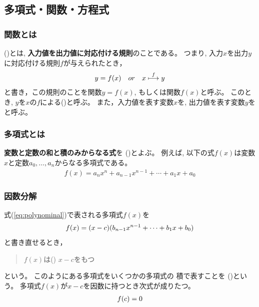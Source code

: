 \documentclass[twocolumn,11pt]{jarticle}
\begin{document}
\subsection{多項式・関数・方程式}

\subsubsection{関数とは}
()とは,
\textbf{入力値を出力値に対応付ける規則}のことである。
つまり, 入力$x$を出力$y$に対応付ける規則$f$が与えられたとき，
\begin{align}
  y=f(x)\quad or\quad x \overset{f}{\longmapsto} y\notag
\end{align}
と書き，この規則のことを関数$y=f(x)$, もしくは関数$f(x)$と呼ぶ。
このとき, $y$を$x$の$f$による()と呼ぶ。
また，入力値を表す変数$x$を,
出力値を表す変数$y$をと呼ぶ。


\subsubsection{多項式とは}
\textbf{変数と定数の和と積のみからなる式}を
()とよぶ。
例えば, 以下の式$f(x)$は変数$x$と定数$a_0,\ldots,a_n$からなる多項式である。
\begin{align}
  \label{eq:polynominal}
  f(x)=a_nx^n+a_{n-1}x^{n-1}+\cdots+a_1x+a_0
\end{align}

\subsubsection{因数分解}
式(\ref{eq:polynominal})で表される多項式$f(x)$を
\begin{align}
f(x)=(x-c)(b_{n-1}x^{n-1}+\cdots+b_1x+b_0) \notag
\end{align}
と書き直せるとき，
\begin{quote}
$f(x)$は()
$x-c$をもつ
\end{quote}
という。
このようにある多項式をいくつかの多項式の
積で表すことを
  ()という。
多項式$f(x)$が$x-c$を因数に持つとき次式が成りたつ。
\begin{align}
  f(c)=0  \notag
\end{align}
\end{document}
